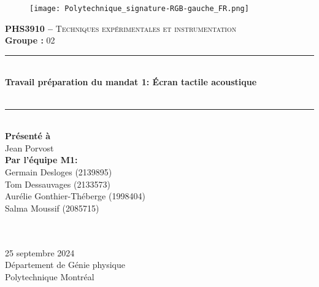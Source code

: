 \begin{titlepage}\center

\begin{figure}
    \texttt{[image: Polytechnique\_signature-RGB-gauche\_FR.png]}
\end{figure}
\vspace*{0.5cm}

\textsc{\Large \textbf{PHS3910 --} Techniques expérimentales et instrumentation}\\[0.5cm] 
\large{\textbf{Groupe : }02}
\\[1.5cm] 

\rule{\linewidth}{0.5mm} \\[0.5cm]
\Large{\textbf{ Travail préparation du mandat 1: Écran tactile acoustique}} \\[0.5cm] \\[0.2cm]
\rule{\linewidth}{0.5mm} \\[2cm]

\large{
 \textbf{Présenté à}\\
 Jean Porvost\\
 [2cm]

  \textbf{Par l'équipe M1:}\\
Germain Desloges (2139895)\\
Tom Dessauvages (2133573) \\
Aurélie Gonthier-Théberge (1998404)\\
Salma Moussif (2085715) \\

 \textbf{} \\
 \textbf{} \\[1cm]}

\large{
25 septembre 2024\\
Département de Génie physique\\
Polytechnique Montréal\\}


\end{titlepage}